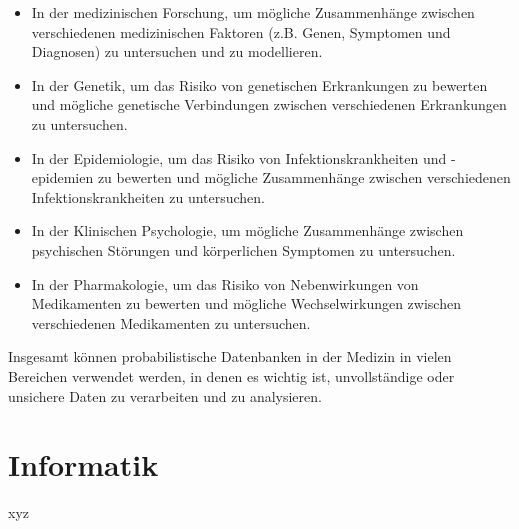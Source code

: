 \begin{itemize}
	\item In der medizinischen Forschung, um mögliche Zusammenhänge zwischen verschiedenen medizinischen Faktoren (z.B. Genen, Symptomen und Diagnosen) zu untersuchen und zu modellieren.
	
	\item In der Genetik, um das Risiko von genetischen Erkrankungen zu bewerten und mögliche genetische Verbindungen zwischen verschiedenen Erkrankungen zu untersuchen.
	
	\item In der Epidemiologie, um das Risiko von Infektionskrankheiten und -epidemien zu bewerten und mögliche Zusammenhänge zwischen verschiedenen Infektionskrankheiten zu untersuchen.
	
	\item In der Klinischen Psychologie, um mögliche Zusammenhänge zwischen psychischen Störungen und körperlichen Symptomen zu untersuchen.
	
	\item In der Pharmakologie, um das Risiko von Nebenwirkungen von Medikamenten zu bewerten und mögliche Wechselwirkungen zwischen verschiedenen Medikamenten zu untersuchen.
	
\end{itemize}
Insgesamt können probabilistische Datenbanken in der Medizin in vielen Bereichen verwendet werden, in denen es wichtig ist, unvollständige oder unsichere Daten zu verarbeiten und zu analysieren.



\section{Informatik}
xyz


